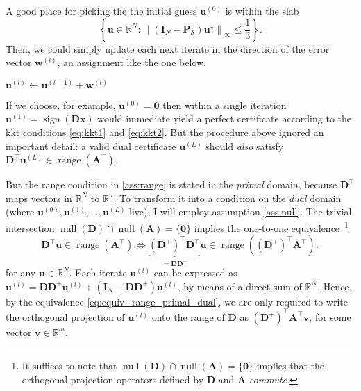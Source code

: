 A good place for picking the the initial guess $\mathbf{u}^{(0)}$ is within the slab
\begin{equation*}
    \left\{\mathbf{u} \in \mathbb{R}^{N} : \left \| \left ( \mathbf{I}_N - \mathbf{P}_\mathcal{S} \right ) \mathbf{u}^\star \right \|_{\infty} \leq \frac{1}{3} \right\}.
\end{equation*}
Then, we could simply update each next iterate in the direction of the error vector $\mathbf{w}^{(l)}$, an assignment like the one below.
\begin{algorithm}[H]
    \begin{algorithmic}[1]
        \State{$\ldots$}
        \State $\mathbf{u}^{(l)} \gets \mathbf{u}^{(l- 1)} + \mathbf{w}^{(l)}$
        \State{$\ldots$}
    \end{algorithmic}
\end{algorithm}

If we choose, for example, $\mathbf{u}^{(0)} = \mathbf{0}$ then within a single iteration $\mathbf{u}^{(1)} = \operatorname{sign} \left ( \mathbf{Dx} \right)$ would immediate yield a perfect certificate according to the \acrshort{kkt} conditions \eqref{eq:kkt1} and \eqref{eq:kkt2}. But the procedure above ignored an important detail: a valid dual certificate $\mathbf{u}^{(L)}$ should \emph{also} satisfy $\mathbf{D}^{\top}\mathbf{u}^{(L)} \in \operatorname{range} \left ( \mathbf{A^{\top}} \right )$.

But the range condition in \eqref{ass:range} is stated in the \emph{primal} domain, because $\mathbf{D}^\top$ maps vectors in $\mathbb{R}^{N}$ to $\mathbb{R}^{n}$. To transform it into a condition on the \emph{dual} domain (where $\mathbf{u}^{(0)}, \mathbf{u}^{(1)}, \dots, \mathbf{u}^{(L)}$ live), I will employ assumption \eqref{ass:null}. The trivial intersection $\operatorname{null} \left ( \mathbf{D} \right ) \cap \operatorname{null} \left ( \mathbf{A} \right ) = \{ \mathbf{0} \}$ implies the one-to-one equivalence~\footnote{It suffices to note that $\operatorname{null} \left ( \mathbf{D} \right ) \cap \operatorname{null} \left ( \mathbf{A} \right ) = \{ \mathbf{0} \}$ implies that the orthogonal projection operators defined by $\mathbf{D}$ and $\mathbf{A}$ \emph{commute}.}
\begin{equation}
    \mathbf{D}^{\top}\mathbf{u} \in \operatorname{range} \left ( \mathbf{A^{\top}} \right ) \iff \underbrace{(\mathbf{D}^{+})^{\top}\mathbf{D}^{\top}}_{= \mathbf{D} \mathbf{D}^{+}}\mathbf{u} \in \operatorname{range} \left ( (\mathbf{D}^{+})^{\top}\mathbf{A^{\top}} \right ),
    \label{eq:equiv_range_primal_dual}
\end{equation}
for any $\mathbf{u} \in \mathbb{R}^{N}$. Each iterate $\mathbf{u}^{(l)}$ can be expressed as $\mathbf{u}^{(l)} = \mathbf{D} \mathbf{D}^{+} \mathbf{u}^{(l)} + \left ( \mathbf{I}_N - \mathbf{D} \mathbf{D}^{+}\right )\mathbf{u}^{(l)}$, by means of a direct sum of $\mathbb{R}^{N}$. Hence, by the equivalence \eqref{eq:equiv_range_primal_dual}, we are only required to write the orthogonal projection of $\mathbf{u}^{(l)}$ onto the range of $\mathbf{D}$ as $(\mathbf{D}^{+})^{\top}\mathbf{A^{\top}} \mathbf{v}$, for some vector $\mathbf{v} \in \mathbb{R}^{m}$.

